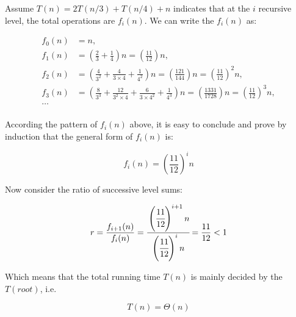 \begin{homeworkProblem}
\begin{homeworkSubProblem}[\texorpdfstring{$T(n)=16T(n/4)+n^2$}{T(n)=16T(n/4)+n\textasciicircum 2}]
\end{homeworkSubProblem}

\begin{homeworkSubProblem}[\texorpdfstring{$T(n)=2T(n/3)+T(n/4)+n$}{T(n)=2T(n/3)+T(n/4)+n}]

Assume $T(n)=2T(n/3)+T(n/4)+n$ indicates that at the $i$ recursive level,
the total operations are $f_i(n)$. We can write the $f_i(n)$ as:

\begin{equation}
\begin{split}
f_0(n) & = n ,\\
f_1(n) & = \left(\frac{2}{3}+\frac{1}{4}\right) n
         = \left(\frac{11}{12}\right) n ,\\
f_2(n) & = \left(\frac{4}{3^2}+\frac{4}{3\times 4}+\frac{1}{4^2}\right) n
         = \left(\frac{121}{144}\right) n
         = \left(\frac{11}{12}\right)^2 n ,\\
f_3(n) & = \left(\frac{8}{3^3}+\frac{12}{3^2\times 4}+\frac{6}{3\times 4^2}
            +\frac{1}{4^3}\right) n
         = \left(\frac{1331}{1728}\right) n
         = \left(\frac{11}{12}\right)^3 n ,\\
\dotso \\ %
\end{split}
\end{equation}

According the pattern of $f_i(n)$ above, it is easy to conclude and prove
by induction that the general form of $f_i(n)$ is:

\begin{equation}
f_i(n) = \left(\frac{11}{12}\right)^i n
\end{equation}

Now consider the ratio of successive level sums:

\begin{equation}
r = \frac{f_{i+1}(n)}{f_i(n)}
  = \cfrac{\left(\cfrac{11}{12}\right)^{i+1} n}{\left(\cfrac{11}{12}\right)^i n}
  = \frac{11}{12}
  < 1
\end{equation}

Which means that the total running time $T(n)$ is mainly decided by the $T(root)$, i.e.

\begin{equation} \label{eq:6.3}
T(n) = \Theta(n)
\end{equation}

\end{homeworkSubProblem}


\end{homeworkProblem}
